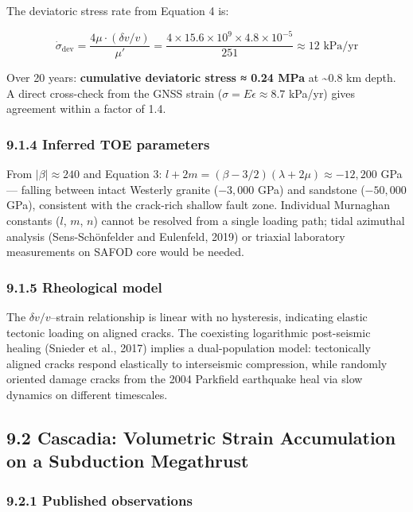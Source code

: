 \documentclass[12pt]{article}
\begin{document}
The deviatoric stress rate from Equation 4 is:

\[\dot{\sigma}_{\text{dev}} = \frac{4\mu \cdot (\delta v/v)}{\mu'} = \frac{4 \times 15.6 \times 10^9 \times 4.8 \times 10^{-5}}{251} \approx 12 \text{ kPa/yr}\]

Over 20 years: \textbf{cumulative deviatoric stress ≈ 0.24 MPa} at
\textasciitilde0.8 km depth. A direct cross-check from the GNSS strain
(\(\sigma = E\epsilon \approx 8.7\) kPa/yr) gives agreement within a
factor of 1.4.

\subsubsection{9.1.4 Inferred TOE
parameters}\label{inferred-toe-parameters}

From \(|\beta| \approx 240\) and Equation 3:
\(l + 2m = (\beta - 3/2)(\lambda + 2\mu) \approx -12{,}200\) GPa ---
falling between intact Westerly granite (\(-3{,}000\) GPa) and sandstone
(\(-50{,}000\) GPa), consistent with the crack-rich shallow fault zone.
Individual Murnaghan constants (\(l\), \(m\), \(n\)) cannot be resolved
from a single loading path; tidal azimuthal analysis (Sens-Schönfelder
and Eulenfeld, 2019) or triaxial laboratory measurements on SAFOD core
would be needed.

\subsubsection{9.1.5 Rheological model}\label{rheological-model}

The \(\delta v/v\)--strain relationship is linear with no hysteresis,
indicating elastic tectonic loading on aligned cracks. The coexisting
logarithmic post-seismic healing (Snieder et al., 2017) implies a
dual-population model: tectonically aligned cracks respond elastically
to interseismic compression, while randomly oriented damage cracks from
the 2004 Parkfield earthquake heal via slow dynamics on different
timescales.

\subsection{9.2 Cascadia: Volumetric Strain Accumulation on a Subduction
Megathrust}\label{cascadia-volumetric-strain-accumulation-on-a-subduction-megathrust}

\subsubsection{9.2.1 Published
observations}\label{published-observations-1}
\end{document}
